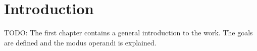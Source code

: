 \chapter{Introduction}
\label{cha:intro}

\npar TODO: The first chapter contains a general introduction to the work. The goals are defined and the modus operandi is explained.
